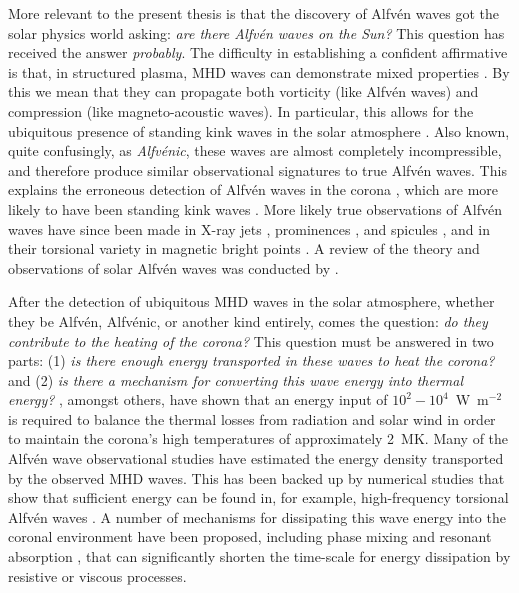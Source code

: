 \documentclass[12pt]{../style-files/ociamthesis}
\begin{document}
More relevant to the present thesis is that the discovery of Alfv\'{e}n waves got the solar physics world asking: \textit{are there Alfv\'{e}n waves on the Sun?} This question has received the answer \textit{probably}. The difficulty in establishing a confident affirmative is that, in structured plasma, MHD waves can demonstrate mixed properties \citep{goo_etal09,goo_etal12,goo_etal19}. By this we mean that they can propagate both vorticity (like Alfv\'{e}n waves) and compression (like magneto-acoustic waves). In particular, this allows for the ubiquitous presence of standing kink waves in the solar atmosphere \citep{tom_etal07}. Also known, quite confusingly, as \textit{Alfv\'{e}nic}, these waves are almost completely incompressible, and therefore produce similar observational signatures to true Alfv\'{e}n waves. This explains the erroneous detection of Alfv\'{e}n waves in the corona \citep{tom_etal07}, which are more likely to have been standing kink waves \cite{van_etal08b}. More likely true observations of Alfv\'{e}n waves have since been made in X-ray jets \citep{cir_etal07}, prominences \citep{oka_etal07}, and spicules \citep{dep_etal07}, and in their torsional variety in magnetic bright points \citep{jes_etal09}. A review of the theory and observations of solar Alfv\'{e}n waves was conducted by \cite{mat_etal13}.

After the detection of ubiquitous MHD waves in the solar atmosphere, whether they be Alfv\'{e}n, Alfv\'{e}nic, or another kind entirely, comes the question: \textit{do they contribute to the heating of the corona?} This question must be answered in two parts: (1) \textit{is there enough energy transported in these waves to heat the corona?} and (2) \textit{is there a mechanism for converting this wave energy into thermal energy?} \cite{wit_etal77}, amongst others, have shown that an energy input of $10^2 - 10^4$~W~m$^{-2}$ is required to balance the thermal losses from radiation and solar wind in order to maintain the corona's high temperatures of approximately 2~MK. Many of the Alfv\'{e}n wave observational studies have estimated the energy density transported by the observed MHD waves. This has been backed up by numerical studies that show that sufficient energy can be found in, for example, high-frequency torsional Alfv\'{e}n waves \citep{sri_etal17}. A number of mechanisms for dissipating this wave energy into the coronal environment have been proposed, including phase mixing \citep{hey_etal83} and resonant absorption \citep{ion78}, that can significantly shorten the time-scale for energy dissipation by resistive or viscous processes.
\end{document}
